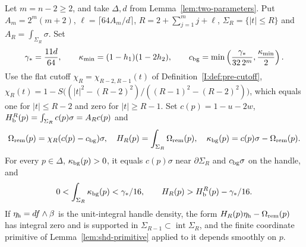 \begin{proposition}\label{prop:two-affine-budget}
Let $m=n-2\ge2$, and take $\Delta,d$ from Lemma~\ref{lem:two-parameters}. Put $A_m=2^m(m+2)$, $\ell=\lceil64A_m/d\rceil$,
$R=2+\sum_{j=1}^m j+\ell$, $\Sigma_R=\{|t|\le R\}$ and $A_R=\int_{\Sigma_R}\sigma$. Set
\[
 \gamma_*=\frac{11d}{64},\qquad
 \kappa_{\min}=(1-h_1)(1-2h_2),\qquad
 c_{\rm bg}=\min\left(\frac{\gamma_*}{32\,2^m},\frac{\kappa_{\min}}2\right).
\]
Use the flat cutoff $\chi_R=\chi_{R-2,R-1}(t)$ of Definition~\ref{I:def:pre-cutoff},
$\chi_R(t)=1-S\bigl((|t|^2-(R-2)^2)/((R-1)^2-(R-2)^2)\bigr)$, which equals one for $|t|\le R-2$ and zero for $|t|\ge R-1$.
Set $c(p)=1-u-2w$, $H_{\mathrm b}^R(p)=\int_{\Sigma_R}c(p)\sigma=A_Rc(p)$ and
\[
 \Omega_{\rm rem}(p)=\chi_R(c(p)-c_{\rm bg})\sigma,\quad
 H_R(p)=\int_{\Sigma_R}\Omega_{\rm rem}(p),\quad
 \kappa_{\rm bg}(p)=c(p)\sigma-\Omega_{\rm rem}(p).
\]
For every $p\in\Delta$, $\kappa_{\rm bg}(p)>0$, it equals $c(p)\sigma$ near $\partial\Sigma_R$ and
$c_{\rm bg}\sigma$ on the handle, and
\[
 0<\int_{\Sigma_R}\kappa_{\rm bg}(p)<\gamma_*/16,\qquad
 H_R(p)>H_{\mathrm b}^R(p)-\gamma_*/16.
\]
If $\eta_{\rm h}=df\wedge\beta$ is the unit-integral handle density, the form $H_R(p)\eta_{\rm h}-\Omega_{\rm rem}(p)$ has integral
zero and is supported in $\Sigma_{R-1}\subset\operatorname{int}\Sigma_R$, and the finite coordinate primitive of
Lemma~\ref{lem:shd-primitive} applied to it depends smoothly on $p$.
\end{proposition}

